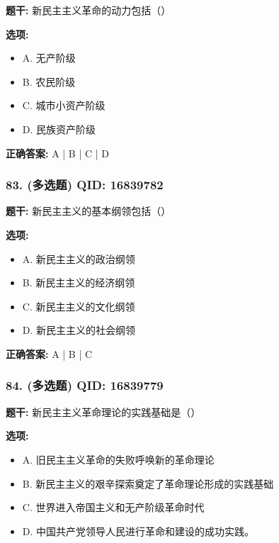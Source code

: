 \documentclass[12pt,UTF8]{ctexart}
\begin{document}
\textbf{题干:}
新民主主义革命的动力包括（）

\textbf{选项:}
\begin{itemize}[leftmargin=*]

  \item A. 无产阶级

  \item B. 农民阶级

  \item C. 城市小资产阶级

  \item D. 民族资产阶级

\end{itemize}

\textbf{正确答案:}
A | B | C | D

\vspace{0.3em}\hrulefill\vspace{0.7em}

\subsubsection*{83. (多选题) \small QID: 16839782}

\textbf{题干:}
新民主主义的基本纲领包括（）

\textbf{选项:}
\begin{itemize}[leftmargin=*]

  \item A. 新民主主义的政治纲领

  \item B. 新民主主义的经济纲领

  \item C. 新民主主义的文化纲领

  \item D. 新民主主义的社会纲领

\end{itemize}

\textbf{正确答案:}
A | B | C

\vspace{0.3em}\hrulefill\vspace{0.7em}

\subsubsection*{84. (多选题) \small QID: 16839779}

\textbf{题干:}
新民主主义革命理论的实践基础是（）

\textbf{选项:}
\begin{itemize}[leftmargin=*]

  \item A. 旧民主主义革命的失败呼唤新的革命理论

  \item B. 新民主主义的艰辛探索奠定了革命理论形成的实践基础

  \item C. 世界进入帝国主义和无产阶级革命时代

  \item D. 中国共产党领导人民进行革命和建设的成功实践。

\end{itemize}
\end{document}
